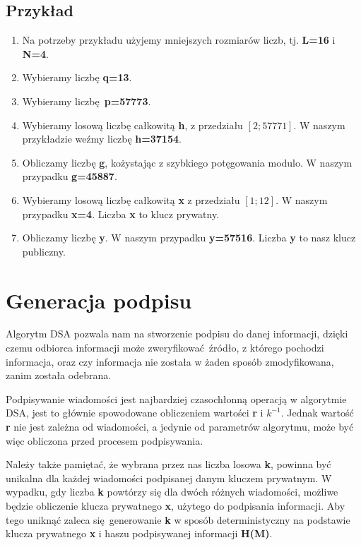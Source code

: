 \documentclass[11pt]{article}
\begin{document}
\subsection{Przykład}
\begin{enumerate}
  \item Na potrzeby przykładu użyjemy mniejszych rozmiarów liczb, tj.
    \textbf{L=16} i \textbf{N=4}.
  \item Wybieramy liczbę \textbf{q=13}.
  \item Wybieramy liczbę \textbf{p=57773}.
  \item Wybieramy losową liczbę całkowitą \textbf{h}, z przedziału $[2; 57771]$.
    W naszym przykładzie weźmy liczbę \textbf{h=37154}.
  \item Obliczamy liczbę \textbf{g}, kożystając z szybkiego potęgowania modulo.
    W naszym przypadku \textbf{g=45887}.
  \item Wybieramy losową liczbę całkowitą \textbf{x} z przedziału $[1; 12]$. W
    naszym przypadku \textbf{x=4}. Liczba \textbf{x} to klucz prywatny.
  \item Obliczamy liczbę \textbf{y}. W naszym przypadku \textbf{y=57516}. Liczba
    \textbf{y} to nasz klucz publiczny.
\end{enumerate}

\section{Generacja podpisu}
Algorytm DSA pozwala nam na stworzenie podpisu do danej informacji, dzięki czemu
odbiorca informacji może zweryfikować źródło, z którego pochodzi informacja,
oraz czy informacja nie została w żaden sposób zmodyfikowana, zanim została
odebrana.

Podpisywanie wiadomości jest najbardziej czasochłonną operacją w algorytmie DSA,
jest to głównie spowodowane obliczeniem wartości \textbf{r} i \textbf{$k^{-1}$}.
Jednak wartość \textbf{r} nie jest zależna od wiadomości, a jedynie od
parametrów algorytmu, może być więc obliczona przed procesem podpisywania.

Należy także pamiętać, że wybrana przez nas liczba losowa \textbf{k}, powinna
być unikalna dla każdej wiadomości podpisanej danym kluczem prywatnym. W
wypadku, gdy liczba \textbf{k} powtórzy się dla dwóch różnych wiadomości,
możliwe będzie obliczenie klucza prywatnego \textbf{x}, użytego do podpisania
informacji. Aby tego uniknąć zaleca się generowanie \textbf{k} w sposób
deterministyczny na podstawie klucza prywatnego \textbf{x} i haszu podpisywanej
informacji \textbf{H(M)}.
\end{document}
